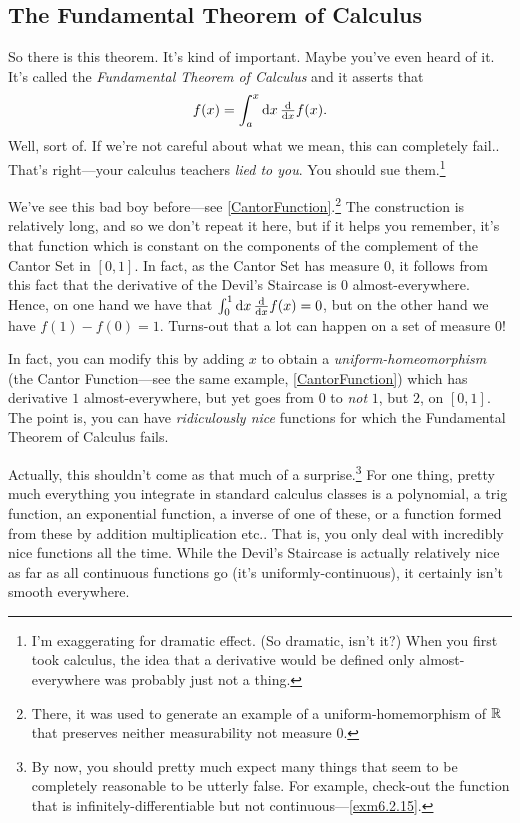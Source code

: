 \subsection{The Fundamental Theorem of Calculus}

So there is this theorem.  It's kind of important.  Maybe you've even heard of it.  It's called the \emph{Fundamental Theorem of Calculus} and it asserts that
\begin{equation}
f(x)=\int _a^x\mathop{}\!\mathrm{d} x\, \tfrac{\mathop{}\!\mathrm{d}}{\mathop{}\!\mathrm{d} x}f(x).
\end{equation}
Well, sort of.  If we're not careful about what we mean, this can completely fail..  That's right---your calculus teachers \emph{lied to you}.  You should sue them.\footnote{I'm exaggerating for dramatic effect.  (So dramatic, isn't it?)  When you first took calculus, the idea that a derivative would be defined only almost-everywhere was probably just not a thing.}
\begin{exm}
We've see this bad boy before---see \cref{CantorFunction}.\footnote{There, it was used to generate an example of a uniform-homemorphism of $\mathbb{R}$ that preserves neither measurability not measure $0$.}  The construction is relatively long, and so we don't repeat it here, but if it helps you remember, it's that function which is constant on the components of the complement of the Cantor Set in $[0,1]$.  In fact, as the Cantor Set has measure $0$, it follows from this fact that the derivative of the Devil's Staircase is $0$ almost-everywhere.  Hence, on one hand we have that $\int _0^1\mathop{}\!\mathrm{d} x\, \frac{\mathop{}\!\mathrm{d}}{\mathop{}\!\mathrm{d} x}f(x)=0$, but on the other hand we have $f(1)-f(0)=1$.  Turns-out that a lot can happen on a set of measure $0$!

In fact, you can modify this by adding $x$ to obtain a \emph{uniform-homeomorphism} (the Cantor Function---see the same example, \cref{CantorFunction}) which has derivative $1$ almost-everywhere, but yet goes from $0$ to \emph{not} $1$, but $2$, on $[0,1]$.  The point is, you can have \emph{ridiculously nice} functions for which the Fundamental Theorem of Calculus fails.
\end{exm}
Actually, this shouldn't come as that much of a surprise.\footnote{By now, you should pretty much expect many things that seem to be completely reasonable to be utterly false.  For example, check-out the function that is infinitely-differentiable but not continuous---\cref{exm6.2.15}.}  For one thing, pretty much everything you integrate in standard calculus classes is a polynomial, a trig function, an exponential function, a inverse of one of these, or a function formed from these by addition multiplication etc..  That is, you only deal with incredibly nice functions all the time.  While the Devil's Staircase is actually relatively nice as far as all continuous functions go (it's uniformly-continuous), it certainly isn't smooth everywhere.

